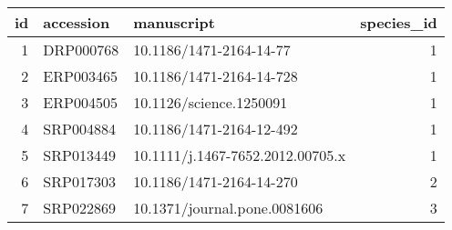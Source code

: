 \begin{tabular}{rllr}
\toprule
   id & accession                                          & manuscript                              &   species\_id \\
\midrule
    1 & DRP000768                                          &  10.1186/1471-2164-14-77          &            1 \\
    2 & ERP003465                                          & 10.1186/1471-2164-14-728            &            1 \\
    3 & ERP004505                                          &  10.1126/science.1250091          &            1 \\
    4 & SRP004884                                          & 10.1186/1471-2164-12-492            &            1 \\
    5 & SRP013449                                          &  10.1111/j.1467-7652.2012.00705.x &            1 \\
    6 & SRP017303                                          & 10.1186/1471-2164-14-270            &            2 \\
    7 & SRP022869                                          &  10.1371/journal.pone.0081606     &            3 \\
\bottomrule
\end{tabular}
